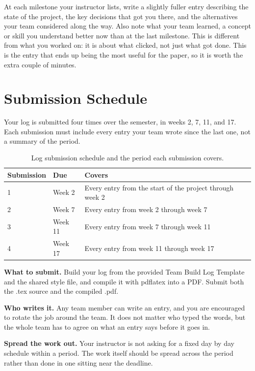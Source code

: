 \documentclass[11pt]{article}
\begin{document}
At each milestone your instructor lists, write a slightly fuller entry describing the state of the project, the key decisions that got you there, and the alternatives your team considered along the way. Also note what your team learned, a concept or skill you understand better now than at the last milestone. This is different from what you worked on: it is about what clicked, not just what got done. This is the entry that ends up being the most useful for the paper, so it is worth the extra couple of minutes.

\section{Submission Schedule}

Your log is submitted four times over the semester, in weeks 2, 7, 11, and 17. Each submission must include every entry your team wrote since the last one, not a summary of the period.

\begin{table}[H]
\centering
\caption{Log submission schedule and the period each submission covers.}
\label{tab:submission-schedule}
\begin{tabular}{@{}p{2.6cm}p{2.2cm}p{7.7cm}@{}}
\toprule
\textbf{Submission} & \textbf{Due} & \textbf{Covers} \\
\midrule
1 & Week 2 & Every entry from the start of the project through week 2 \\
2 & Week 7 & Every entry from week 2 through week 7 \\
3 & Week 11 & Every entry from week 7 through week 11 \\
4 & Week 17 & Every entry from week 11 through week 17 \\
\bottomrule
\end{tabular}
\end{table}

\textbf{What to submit.} Build your log from the provided Team Build Log Template and the shared style file, and compile it with pdflatex into a PDF. Submit both the .tex source and the compiled .pdf.

\textbf{Who writes it.} Any team member can write an entry, and you are encouraged to rotate the job around the team. It does not matter who typed the words, but the whole team has to agree on what an entry says before it goes in.

\textbf{Spread the work out.} Your instructor is not asking for a fixed day by day schedule within a period. The work itself should be spread across the period rather than done in one sitting near the deadline.
\end{document}
